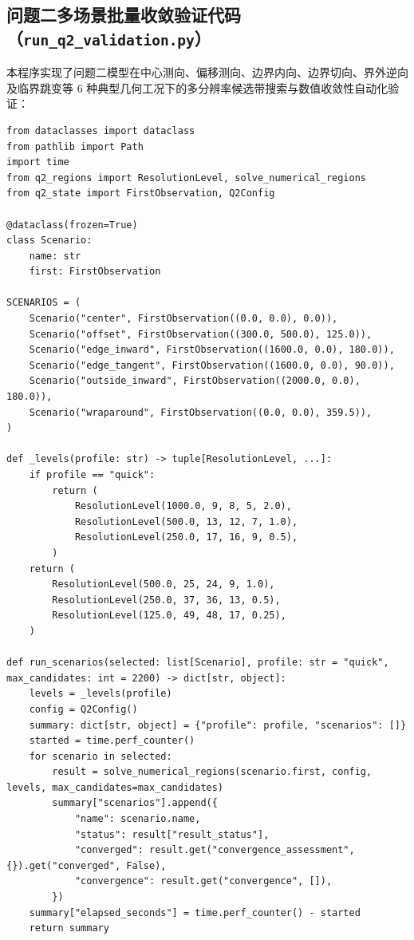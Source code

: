 \subsection{问题二多场景批量收敛验证代码（\texttt{run\_q2\_validation.py}）}
本程序实现了问题二模型在中心测向、偏移测向、边界内向、边界切向、界外逆向及临界跳变等 6 种典型几何工况下的多分辨率候选带搜索与数值收敛性自动化验证：

\begin{lstlisting}[caption={问题二多场景收敛验证程序（run\_q2\_validation.py）}]
from dataclasses import dataclass
from pathlib import Path
import time
from q2_regions import ResolutionLevel, solve_numerical_regions
from q2_state import FirstObservation, Q2Config

@dataclass(frozen=True)
class Scenario:
    name: str
    first: FirstObservation

SCENARIOS = (
    Scenario("center", FirstObservation((0.0, 0.0), 0.0)),
    Scenario("offset", FirstObservation((300.0, 500.0), 125.0)),
    Scenario("edge_inward", FirstObservation((1600.0, 0.0), 180.0)),
    Scenario("edge_tangent", FirstObservation((1600.0, 0.0), 90.0)),
    Scenario("outside_inward", FirstObservation((2000.0, 0.0), 180.0)),
    Scenario("wraparound", FirstObservation((0.0, 0.0), 359.5)),
)

def _levels(profile: str) -> tuple[ResolutionLevel, ...]:
    if profile == "quick":
        return (
            ResolutionLevel(1000.0, 9, 8, 5, 2.0),
            ResolutionLevel(500.0, 13, 12, 7, 1.0),
            ResolutionLevel(250.0, 17, 16, 9, 0.5),
        )
    return (
        ResolutionLevel(500.0, 25, 24, 9, 1.0),
        ResolutionLevel(250.0, 37, 36, 13, 0.5),
        ResolutionLevel(125.0, 49, 48, 17, 0.25),
    )

def run_scenarios(selected: list[Scenario], profile: str = "quick", max_candidates: int = 2200) -> dict[str, object]:
    levels = _levels(profile)
    config = Q2Config()
    summary: dict[str, object] = {"profile": profile, "scenarios": []}
    started = time.perf_counter()
    for scenario in selected:
        result = solve_numerical_regions(scenario.first, config, levels, max_candidates=max_candidates)
        summary["scenarios"].append({
            "name": scenario.name,
            "status": result["result_status"],
            "converged": result.get("convergence_assessment", {}).get("converged", False),
            "convergence": result.get("convergence", []),
        })
    summary["elapsed_seconds"] = time.perf_counter() - started
    return summary
\end{lstlisting}

